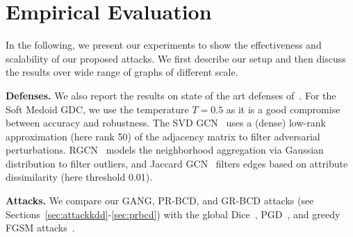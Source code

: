 \documentclass[letterpaper]{article} %
\newcommand{\todo}[1]{\textcolor{red}{(Todo: #1)}}
\begin{document}
\section{Empirical Evaluation}\label{sec:empirical}

In the following, we present our experiments to show the effectiveness and scalability of our proposed attacks. We first describe our setup and then discuss the results over wide range of graphs of different scale.

\textbf{Defenses.} We also report the results on state of the art defenses of~\citep{Entezari2020, Geisler2020, Wu2019, Zhu2019}. For the Soft Medoid GDC, we use the temperature \(T=0.5\) as it is a good compromise between accuracy and robustness. The SVD GCN~\citep{Entezari2020} uses a (dense) low-rank approximation (here rank 50) of the adjacency matrix to filter adversarial perturbations. RGCN~\citep{Zhu2019} models the neighborhood aggregation via Gaussian distribution to filter outliers, and Jaccard GCN~\citep{Wu2019} filters edges based on attribute dissimilarity (here threshold 0.01). 


\textbf{Attacks.} We compare our GANG, PR-BCD, and GR-BCD attacks (see Sections~\ref{sec:attackkdd}-\ref{sec:prbcd}) with the global Dice~\citep{Waniek2018}, PGD~\citep{Xu2019a}, and greedy FGSM attacks~\citet{Geisler2020}.

\begin{table}[t]
\centering
\caption{Statistics of the used datasets. For the dense adjacency matrix we assume that each element is represented by 4 bytes. In the sparse case we use two 8 byte integer pointers and a 4 bytes float value.}
\label{tab:datasets}
\end{table}
\end{document}
